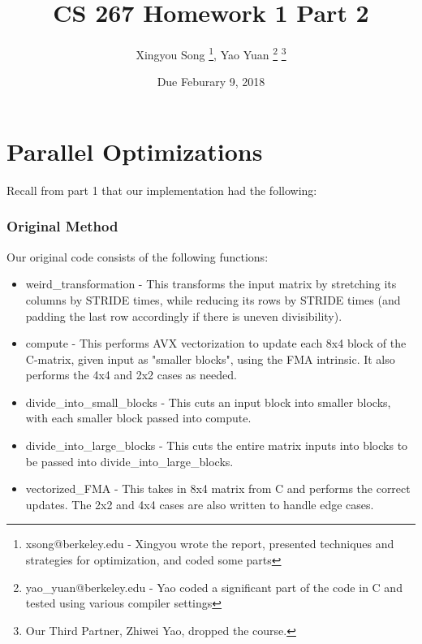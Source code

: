 \documentclass[12pt]{article}
\begin{document}
 
 
 
\title{CS 267 Homework 1 Part 2}
\author{Xingyou Song \footnote{xsong@berkeley.edu - Xingyou wrote the report, presented techniques and strategies for optimization, and coded some parts}, Yao Yuan \footnote{yao\_yuan@berkeley.edu - Yao coded a significant part of the code in C and tested using various compiler settings} \footnote{Our Third Partner, Zhiwei Yao, dropped the course.}} %
\date{Due Feburary 9, 2018} 
\maketitle

\section{Parallel Optimizations}
Recall from part 1 that our implementation had the following:

\subsubsection{Original Method}
Our original code consists of the following functions:
\begin{itemize}
\item weird\_transformation - This transforms the input matrix by stretching its columns by STRIDE times, while reducing its rows by STRIDE times (and padding the last row accordingly if there is uneven divisibility).
\item compute - This performs AVX vectorization to update each 8x4 block of the C-matrix, given input as "smaller blocks", using the FMA intrinsic. It also performs the 4x4 and 2x2 cases as needed. 
\item divide\_into\_small\_blocks - This cuts an input block into smaller blocks, with each smaller block passed into compute. 
\item divide\_into\_large\_blocks - This cuts the entire matrix inputs into blocks to be passed into divide\_into\_large\_blocks. 
\item vectorized\_FMA - This takes in 8x4 matrix from C and performs the correct updates. The 2x2 and 4x4 cases are also written to handle edge cases. 
\end{itemize}
\end{document}
